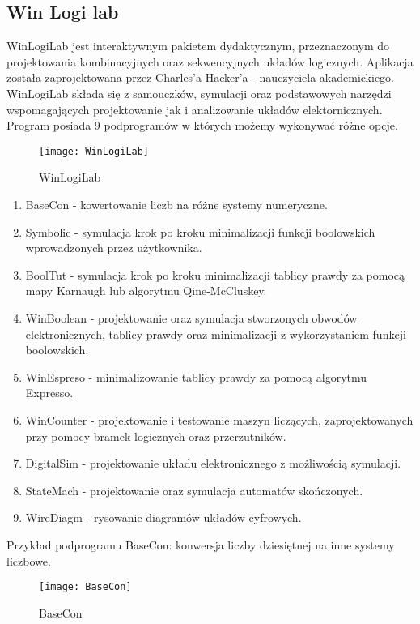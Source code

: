 \documentclass[12pt, a4paper, onside, polish]{article}				%
\begin{document}
\cleardoublepage

\subsection{Win Logi lab}
\hspace{\parindent}
WinLogiLab jest interaktywnym pakietem dydaktycznym, przeznaczonym do projektowania kombinacyjnych oraz sekwencyjnych układów logicznych. Aplikacja została zaprojektowana przez Charles’a Hacker’a - nauczyciela akademickiego. WinLogiLab składa się z samouczków, symulacji oraz podstawowych narzędzi wspomagających projektowanie jak i analizowanie układów elektornicznych. 
\newline\newline
Program posiada 9 podprogramów w których możemy wykonywać różne opcje.

\begin{figure}[hbt!]
	{\centering \texttt{[image: WinLogiLab]} \caption{WinLogiLab}}\vspace{5mm}
\end{figure}

\begin{enumerate}
\item BaseCon - kowertowanie liczb na różne systemy numeryczne.
\item Symbolic - symulacja krok po kroku minimalizacji funkcji boolowskich wprowadzonych przez użytkownika.
\item BoolTut - symulacja krok po kroku minimalizacji tablicy prawdy za pomocą mapy Karnaugh lub algorytmu Qine-McCluskey.
\item WinBoolean - projektowanie oraz symulacja stworzonych obwodów elektronicznych, tablicy prawdy oraz minimalizacji z wykorzystaniem funkcji boolowskich.
\item WinEspreso - minimalizowanie tablicy prawdy za pomocą algorytmu Expresso.
\item WinCounter - projektowanie i testowanie maszyn liczących, zaprojektowanych przy pomocy bramek logicznych oraz przerzutników.
\item DigitalSim - projektowanie układu elektronicznego z możliwością symulacji.
\item StateMach - projektowanie oraz symulacja automatów skończonych.
\item WireDiagm - rysowanie diagramów układów cyfrowych. \newline
\end{enumerate}
Przykład podprogramu BaseCon: konwersja liczby dziesiętnej na inne systemy liczbowe.
	\begin{figure}[hbt!]
		{\centering \texttt{[image: BaseCon]} \caption{BaseCon}}\vspace{5mm}
	\end{figure}
\end{document}

